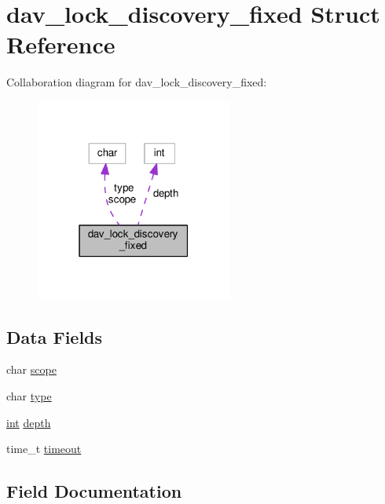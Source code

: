 \hypertarget{structdav__lock__discovery__fixed}{}\section{dav\+\_\+lock\+\_\+discovery\+\_\+fixed Struct Reference}
\label{structdav__lock__discovery__fixed}


Collaboration diagram for dav\+\_\+lock\+\_\+discovery\+\_\+fixed\+:
\nopagebreak
\begin{figure}[H]
\begin{center}
\leavevmode
\includegraphics[width=183pt]{structdav__lock__discovery__fixed__coll__graph}
\end{center}
\end{figure}
\subsection*{Data Fields}
\begin{DoxyCompactItemize}
\item 
char \hyperlink{structdav__lock__discovery__fixed_a8c785ca0e2841243811d9fabbde3dba8}{scope}
\item 
char \hyperlink{structdav__lock__discovery__fixed_a969c3ad0b69664b66fefb74a40b1c1bd}{type}
\item 
\hyperlink{pcre_8txt_a42dfa4ff673c82d8efe7144098fbc198}{int} \hyperlink{structdav__lock__discovery__fixed_adc6116b74f4c03f2d2153c4fb63eaa55}{depth}
\item 
time\+\_\+t \hyperlink{structdav__lock__discovery__fixed_a6f25c172ac197fc220caead330a10691}{timeout}
\end{DoxyCompactItemize}


\subsection{Field Documentation}
